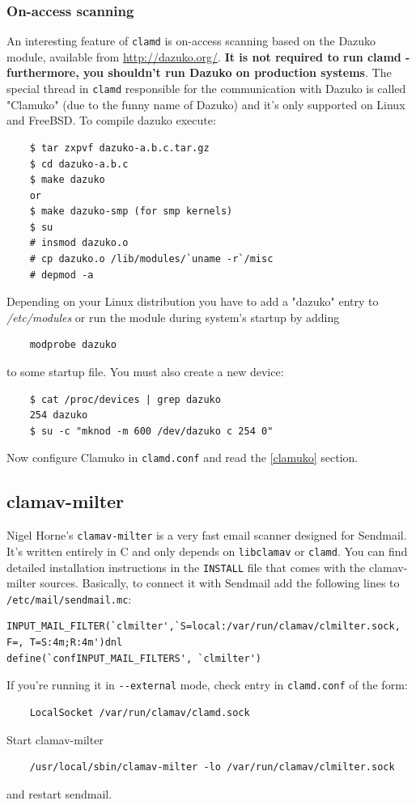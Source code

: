\documentclass[a4paper,titlepage,12pt]{article}
\begin{document}
    \subsubsection{On-access scanning}
    An interesting feature of \verb+clamd+ is on-access scanning based on the
    Dazuko module, available from \url{http://dazuko.org/}. \textbf{It is not
    required to run clamd - furthermore, you shouldn't run Dazuko on production
    systems}. The special thread in \verb+clamd+ responsible for the
    communication with Dazuko is called "Clamuko" (due to the funny name of
    Dazuko) and it's only supported on Linux and FreeBSD. To compile dazuko
    execute:
    \begin{verbatim}
	$ tar zxpvf dazuko-a.b.c.tar.gz
	$ cd dazuko-a.b.c
	$ make dazuko
	or
	$ make dazuko-smp (for smp kernels)
	$ su
	# insmod dazuko.o
	# cp dazuko.o /lib/modules/`uname -r`/misc
	# depmod -a
    \end{verbatim}
    Depending on your Linux distribution you have to add a "dazuko" entry to
    \emph{/etc/modules} or run the module during system's startup by adding
    \begin{verbatim}
	modprobe dazuko
    \end{verbatim}
    to some startup file. You must also create a new device:
    \begin{verbatim}
	$ cat /proc/devices | grep dazuko
	254 dazuko
	$ su -c "mknod -m 600 /dev/dazuko c 254 0"
    \end{verbatim}
    Now configure Clamuko in \verb+clamd.conf+ and read the \ref{clamuko}
    section.

    \subsection{clamav-milter}
    Nigel Horne's \verb+clamav-milter+ is a very fast email scanner designed for
    Sendmail. It's written entirely in C and only depends on \verb+libclamav+
    or \verb+clamd+. You can find detailed installation instructions in the
    \verb+INSTALL+ file that comes with the clamav-milter sources. Basically,
    to connect it with Sendmail add the following lines to
    \verb+/etc/mail/sendmail.mc+:
    \begin{verbatim}
INPUT_MAIL_FILTER(`clmilter',`S=local:/var/run/clamav/clmilter.sock,
F=, T=S:4m;R:4m')dnl
define(`confINPUT_MAIL_FILTERS', `clmilter')
    \end{verbatim}
    If you're running it in \verb+--external+ mode, check entry in
    \verb+clamd.conf+ of the form:
    \begin{verbatim}
	LocalSocket /var/run/clamav/clamd.sock
    \end{verbatim}
    Start clamav-milter
    \begin{verbatim}
	/usr/local/sbin/clamav-milter -lo /var/run/clamav/clmilter.sock
    \end{verbatim}
    and restart sendmail.
\end{document}
